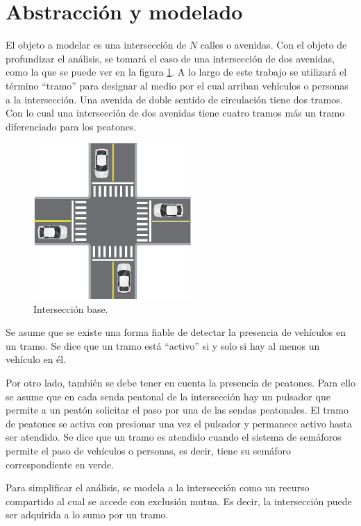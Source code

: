\section{Abstracción y modelado}
El objeto a modelar es una intersección de $N$ calles o avenidas. Con el objeto de profundizar el análisis, se tomará el caso de una intersección de dos avenidas, como la que se puede ver en la figura \ref{fig:interseccion-base}. A lo largo de este trabajo se utilizará el término \enquote{tramo} para designar al medio por el cual arriban vehículos o personas a la intersección. Una avenida de doble sentido de circulación tiene dos tramos. Con lo cual una intersección de dos avenidas tiene cuatro tramos más un tramo diferenciado para los peatones.

\begin{figure}[htbp]
	\centering
	\includegraphics[width=6cm]{imagenes/interseccion-base.eps}
	\caption{Intersección base.}
	\label{fig:interseccion-base}
\end{figure}

Se asume que se existe una forma fiable de detectar la presencia de vehículos en un tramo. Se dice que un tramo está \enquote{activo} si y solo si hay al menos un vehículo en él.

Por otro lado, también se debe tener en cuenta la presencia de peatones. Para ello se asume que en cada senda peatonal de la intersección hay un pulsador que permite a un peatón solicitar el paso por una de las sendas peatonales. El tramo de peatones se activa con presionar una vez el pulsador y permanece activo hasta ser atendido. Se dice que un tramo es atendido cuando el sistema de semáforos permite el paso de vehículos o personas, es decir, tiene su semáforo correspondiente en verde.

Para simplificar el análisis, se modela a la intersección como un recurso compartido al cual se accede con exclusión mutua. Es decir, la intersección puede ser adquirida a lo sumo por un tramo.

